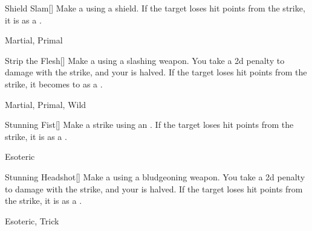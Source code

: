 \lowercase{\hypertarget{maneuver:Shield Slam}{}}\label{maneuver:Shield Slam}
\hypertarget{maneuver:Shield Slam}{}
\begin{freeability}[Rank 1]{Shield Slam}[]
Make a  using a shield.
If the target loses hit points from the strike, it is  as a .


 Martial, Primal
\end{freeability}
\vspace{0.25em}



\lowercase{\hypertarget{maneuver:Strip the Flesh}{}}\label{maneuver:Strip the Flesh}
\hypertarget{maneuver:Strip the Flesh}{}
\begin{freeability}[Rank 1]{Strip the Flesh}[]
Make a  using a slashing weapon.
You take a \minus2d penalty to damage with the strike, and your  is halved.
If the target loses hit points from the strike, it becomes  to  as a .


 Martial, Primal, Wild
\end{freeability}
\vspace{0.25em}



\lowercase{\hypertarget{maneuver:Stunning Fist}{}}\label{maneuver:Stunning Fist}
\hypertarget{maneuver:Stunning Fist}{}
\begin{freeability}[Rank 1]{Stunning Fist}[]
Make a strike using an .
If the target loses hit points from the strike, it is  as a .


 Esoteric
\end{freeability}
\vspace{0.25em}



\lowercase{\hypertarget{maneuver:Stunning Headshot}{}}\label{maneuver:Stunning Headshot}
\hypertarget{maneuver:Stunning Headshot}{}
\begin{freeability}[Rank 1]{Stunning Headshot}[]
Make a  using a bludgeoning weapon.
You take a \minus2d penalty to damage with the strike, and your  is halved.
If the target loses hit points from the strike, it is  as a .


 Esoteric, Trick
\end{freeability}
\vspace{0.25em}



